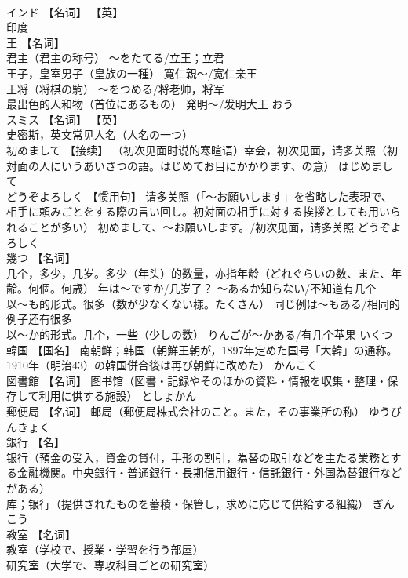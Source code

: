 \documentclass[8pt]{extreport}
\begin{document}
\begin{CJK}{UTF8}{min}
\\	インド	【名词】 【英】
\\	印度		
\\	王	【名词】 
\\	君主（君主の称号） ～をたてる/立王；立君 
\\	王子，皇室男子（皇族の一種） 寛仁親～/宽仁亲王 
\\	王将（将棋の駒） ～をつめる/将老帅，将军 
\\	最出色的人和物（首位にあるもの） 発明～/发明大王	おう	
\\	スミス	【名词】 【英】
\\	史密斯，英文常见人名（人名の一つ）		
\\	初めまして	【接续】 （初次见面时说的寒暄语）幸会，初次见面，请多关照（初対面の人にいうあいさつの語。はじめてお目にかかります、の意）	はじめまして	
\\	どうぞよろしく	【惯用句】 请多关照（「～お願いします」を省略した表現で、相手に頼みごとをする際の言い回し。初対面の相手に対する挨拶としても用いられることが多い） 初めまして、～お願いします。/初次见面，请多关照	どうぞよろしく	
\\	幾つ	【名词】 
\\	几个，多少，几岁。多少（年头）的数量，亦指年龄（どれぐらいの数、また、年齢。何個。何歳） 年は〜ですか/几岁了？ 〜あるか知らない/不知道有几个 
\\	以〜も的形式。很多（数が少なくない様。たくさん） 同じ例は〜もある/相同的例子还有很多 
\\	以〜か的形式。几个，一些（少しの数） りんごが〜かある/有几个苹果	いくつ	
\\	韓国	【国名】 南朝鲜；韩国（朝鮮王朝が，1897年定めた国号「大韓」の通称。1910年（明治43）の韓国併合後は再び朝鮮に改めた）	かんこく	
\\	図書館	【名词】 图书馆（図書・記録やそのほかの資料・情報を収集・整理・保存して利用に供する施設）	としょかん	
\\	郵便局	【名词】 邮局（郵便局株式会社のこと。また，その事業所の称）	ゆうびんきょく	
\\	銀行	【名】 
\\	银行（預金の受入，資金の貸付，手形の割引，為替の取引などを主たる業務とする金融機関。中央銀行・普通銀行・長期信用銀行・信託銀行・外国為替銀行などがある） 
\\	库；银行（提供されたものを蓄積・保管し，求めに応じて供給する組織）	ぎんこう	
\\	教室	【名词】 
\\	教室（学校で、授業・学習を行う部屋） 
\\	研究室（大学で、専攻科目ごとの研究室） 

\end{CJK}
\end{document}
